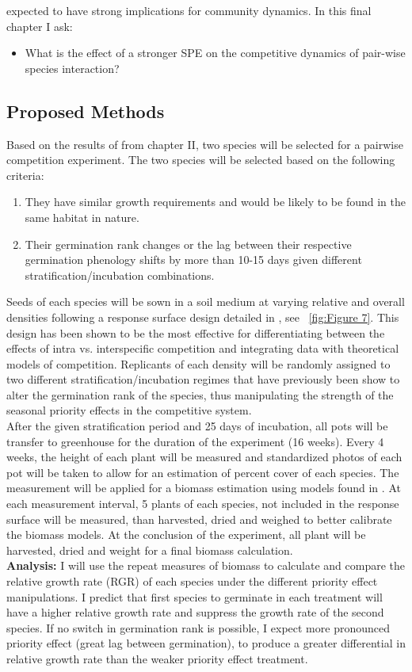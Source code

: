 \documentclass{article}\usepackage[]{graphicx}\usepackage[]{color}
\begin{document}
expected to have strong implications for community dynamics. In this final chapter I ask:
\begin{itemize}
\item What is the effect of a stronger SPE on the competitive dynamics of pair-wise species interaction?
\end{itemize}
\subsection*{Proposed Methods}
\indent\indent Based on the results of from chapter II, two species will be selected for a pairwise competition experiment. The two species will be selected based on the following criteria:
\begin{enumerate}
\item They have similar growth requirements and would be likely to be found in the same habitat in nature.
\item Their germination rank changes or the lag between their respective germination phenology shifts by more than 10-15 days given different stratification/incubation combinations.
\end{enumerate}
\indent\indent Seeds of each species will be sown in a soil medium at varying relative and overall densities following a response surface design detailed in \cite{Inouye2001}, see ~\ref{fig:Figure 7}. This design has been shown to be the most effective for differentiating between the effects of intra vs. interspecific competition and integrating data with theoretical models of competition.  Replicants of each density will be randomly assigned to two different stratification/incubation regimes that have previously been show to alter the germination rank of the species, thus manipulating the strength of the seasonal priority effects in the competitive system.\\
After the given stratification period and 25 days of incubation, all pots will be transfer to greenhouse for the duration of the experiment (16 weeks). Every 4 weeks, the height of each plant will be measured and standardized photos of each pot will be taken to allow for an estimation of percent cover of each species. The measurement will be applied for a biomass estimation using models found in \citet{Axmanova2012}. At each measurement interval, 5 plants of each species, not included in the response surface will be measured, than harvested, dried and weighed to better calibrate the biomass models. At the conclusion of the experiment, all plant will be harvested, dried and weight for a final biomass calculation.\\
\indent\textbf{Analysis:} I will use the repeat measures of biomass to calculate and compare the relative growth rate (RGR) \citep{Connolly2005} of each species under the different priority effect manipulations. I predict that first species to germinate in each treatment will have a higher relative growth rate and suppress the growth rate of the second species. If no switch in germination rank is possible, I expect more pronounced priority effect (great lag between germination), to produce a greater differential in relative growth rate than the weaker priority effect treatment.\\  
\end{document}
